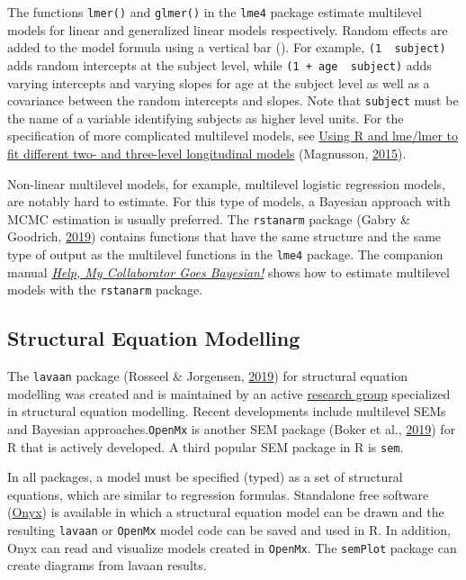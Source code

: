 \documentclass[doc,floatsintext]{apa6}
\begin{document}
The functions \texttt{lmer()} and \texttt{glmer()} in the \texttt{lme4}
package estimate multilevel models for linear and generalized linear
models respectively. Random effects are added to the model formula using
a vertical bar (\texttt{\textbar{}}). For example,
\texttt{(1\ \textbar{}\ subject)} adds random intercepts at the subject
level, while \texttt{(1\ +\ age\ \textbar{}\ subject)} adds varying
intercepts and varying slopes for age at the subject level as well as a
covariance between the random intercepts and slopes. Note that
\texttt{subject} must be the name of a variable identifying subjects as
higher level units. For the specification of more complicated multilevel
models, see
\href{https://rpsychologist.com/r-guide-longitudinal-lme-lmer}{Using R
and lme/lmer to fit different two- and three-level longitudinal models}
(Magnusson, \protect\hyperlink{ref-magnussonUsingLmeLmer2015}{2015}).

Non-linear multilevel models, for example, multilevel logistic
regression models, are notably hard to estimate. For this type of
models, a Bayesian approach with MCMC estimation is usually preferred.
The \texttt{rstanarm} package (Gabry \& Goodrich,
\protect\hyperlink{ref-R-rstanarm}{2019}) contains functions that have
the same structure and the same type of output as the multilevel
functions in the \texttt{lme4} package. The companion manual
\href{https://wdenooy.github.io/Switch2Bayesian/HelpMyCollaboratorGoesBayesian.html\#32_r_rstanarm_package}{\emph{Help,
My Collaborator Goes Bayesian!}} shows how to estimate multilevel models
with the \texttt{rstanarm} package.

\subsection{Structural Equation Modelling}\label{sem}

The \texttt{lavaan} package (Rosseel \& Jorgensen,
\protect\hyperlink{ref-R-lavaan}{2019}) for structural equation
modelling was created and is maintained by an active
\href{http://lavaan.ugent.be/}{research group} specialized in structural
equation modelling. Recent developments include multilevel SEMs and
Bayesian approaches.\texttt{OpenMx} is another SEM package (Boker et
al., \protect\hyperlink{ref-R-OpenMx}{2019}) for R that is actively
developed. A third popular SEM package in R is \texttt{sem}.

In all packages, a model must be specified (typed) as a set of
structural equations, which are similar to regression formulas.
Standalone free software (\href{http://onyx.brandmaier.de/}{Onyx}) is
available in which a structural equation model can be drawn and the
resulting \texttt{lavaan} or \texttt{OpenMx} model code can be saved and
used in R. In addition, Onyx can read and visualize models created in
\texttt{OpenMx}. The \texttt{semPlot} package can create diagrams from
lavaan results.
\end{document}

